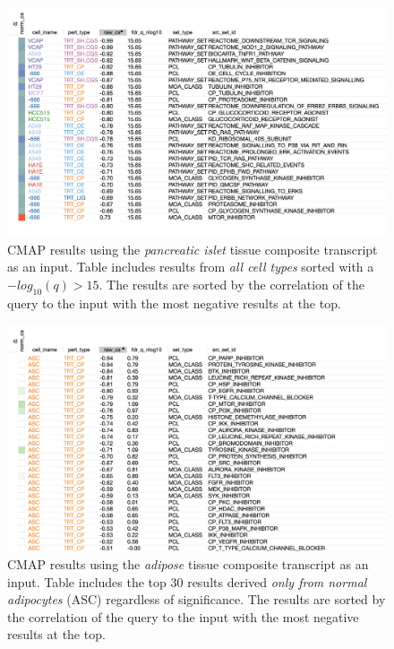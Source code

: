 \documentclass[
]{article}
\begin{document}
\begin{figure}[ht!]
\includegraphics[width=\textwidth]{Figures/Supp_Fig_Islet_all_cell_types.png} 
\caption{CMAP results using the \textit{pancreatic islet} tissue composite transcript 
as an input. Table includes results from \textit{all cell types} sorted with a 
$-log_{10}(q) > 15$. The results are sorted by the correlation of the 
query to the input with the most negative results at the top.
}
\label{fig:clue_islet_all}
\end{figure}

\begin{figure}[ht!]
\includegraphics[width=\textwidth]{Figures/Supp_Fig_Adipose_ASC.png} 
\caption{CMAP results using the \textit{adipose} tissue composite 
transcript as an input. Table includes the top 30 results derived
\textit{only from normal adipocytes} (ASC) regardless of significance. 
The results are sorted by the correlation of the query to the input 
with the most negative results at the top.
}
\label{fig:clue_adipose_asc}
\end{figure}
\end{document}
